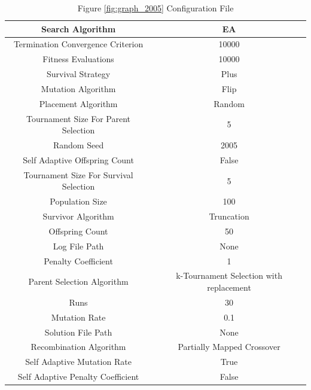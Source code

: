 \documentclass{standalone}
\begin{document}
\begin{table}[!htb]
	\centering
	\caption{Figure \ref{fig:graph_2005} Configuration File}
	\label{tab:graph_2005}
	\begin{tabular}{| c | c |}
		\hline
		Search Algorithm		& EA		 \\
		\hline
		Termination Convergence Criterion		& 10000		 \\
		\hline
		Fitness Evaluations		& 10000		 \\
		\hline
		Survival Strategy		& Plus		 \\
		\hline
		Mutation Algorithm		& Flip		 \\
		\hline
		Placement Algorithm		& Random		 \\
		\hline
		Tournament Size For Parent Selection		& 5		 \\
		\hline
		Random Seed		& 2005		 \\
		\hline
		Self Adaptive Offspring Count		& False		 \\
		\hline
		Tournament Size For Survival Selection		& 5		 \\
		\hline
		Population Size		& 100		 \\
		\hline
		Survivor Algorithm		& Truncation		 \\
		\hline
		Offspring Count		& 50		 \\
		\hline
		Log File Path		& None		 \\
		\hline
		Penalty Coefficient		& 1		 \\
		\hline
		Parent Selection Algorithm		& k-Tournament Selection with replacement		 \\
		\hline
		Runs		& 30		 \\
		\hline
		Mutation Rate		& 0.1		 \\
		\hline
		Solution File Path		& None		 \\
		\hline
		Recombination Algorithm		& Partially Mapped Crossover		 \\
		\hline
		Self Adaptive Mutation Rate		& True		 \\
		\hline
		Self Adaptive Penalty Coefficient		& False		 \\
		\hline
	\end{tabular}
\end{table}
\end{document}
